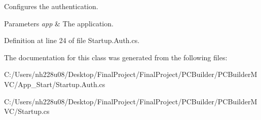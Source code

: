 Configures the authentication. 


\begin{DoxyParams}{Parameters}
{\em app} & The application.\\
\hline
\end{DoxyParams}


Definition at line 24 of file Startup.\+Auth.\+cs.



The documentation for this class was generated from the following files\+:\begin{DoxyCompactItemize}
\item 
C\+:/\+Users/nh228u08/\+Desktop/\+Final\+Project/\+Final\+Project/\+P\+C\+Builder/\+P\+C\+Builder\+M\+V\+C/\+App\+\_\+\+Start/Startup.\+Auth.\+cs\item 
C\+:/\+Users/nh228u08/\+Desktop/\+Final\+Project/\+Final\+Project/\+P\+C\+Builder/\+P\+C\+Builder\+M\+V\+C/Startup.\+cs\end{DoxyCompactItemize}
